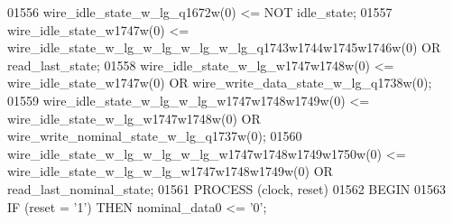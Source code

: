 \begin{DoxyCode}
{01556     \textcolor{vhdlchar}{wire_idle_state_w_lg_q1672w}\textcolor{vhdlchar}{(}\textcolor{vhdllogic}{}\textcolor{vhdllogic}{0}\textcolor{vhdlchar}{)} \textcolor{vhdlchar}{<=} \textcolor{keywordflow}{NOT} \textcolor{vhdlchar}{idle_state};
01557     \textcolor{vhdlchar}{wire_idle_state_w1747w}\textcolor{vhdlchar}{(}\textcolor{vhdllogic}{}\textcolor{vhdllogic}{0}\textcolor{vhdlchar}{)} \textcolor{vhdlchar}{<=} \textcolor{vhdlchar}{
      wire_idle_state_w_lg_w_lg_w_lg_w_lg_q1743w1744w1745w1746w}\textcolor{vhdlchar}{(}\textcolor{vhdllogic}{}\textcolor{vhdllogic}{0}\textcolor{vhdlchar}{)} \textcolor{keywordflow}{OR} \textcolor{vhdlchar}{read_last_state};
01558     \textcolor{vhdlchar}{wire_idle_state_w_lg_w1747w1748w}\textcolor{vhdlchar}{(}\textcolor{vhdllogic}{}\textcolor{vhdllogic}{0}\textcolor{vhdlchar}{)} \textcolor{vhdlchar}{<=} \textcolor{vhdlchar}{wire_idle_state_w1747w}\textcolor{vhdlchar}{(}\textcolor{vhdllogic}{}\textcolor{vhdllogic}{0}\textcolor{vhdlchar}{)} \textcolor{keywordflow}{OR} \textcolor{vhdlchar}{
      wire_write_data_state_w_lg_q1738w}\textcolor{vhdlchar}{(}\textcolor{vhdllogic}{}\textcolor{vhdllogic}{0}\textcolor{vhdlchar}{)};
01559     \textcolor{vhdlchar}{wire_idle_state_w_lg_w_lg_w1747w1748w1749w}\textcolor{vhdlchar}{(}\textcolor{vhdllogic}{}\textcolor{vhdllogic}{0}\textcolor{vhdlchar}{)} \textcolor{vhdlchar}{<=} \textcolor{vhdlchar}{
      wire_idle_state_w_lg_w1747w1748w}\textcolor{vhdlchar}{(}\textcolor{vhdllogic}{}\textcolor{vhdllogic}{0}\textcolor{vhdlchar}{)} \textcolor{keywordflow}{OR} \textcolor{vhdlchar}{wire_write_nominal_state_w_lg_q1737w}\textcolor{vhdlchar}{(}\textcolor{vhdllogic}{}\textcolor{vhdllogic}{0}\textcolor{vhdlchar}{)};
01560     \textcolor{vhdlchar}{wire_idle_state_w_lg_w_lg_w_lg_w1747w1748w1749w1750w}\textcolor{vhdlchar}{(}\textcolor{vhdllogic}{}\textcolor{vhdllogic}{0}\textcolor{vhdlchar}{)} \textcolor{vhdlchar}{<=} \textcolor{vhdlchar}{
      wire_idle_state_w_lg_w_lg_w1747w1748w1749w}\textcolor{vhdlchar}{(}\textcolor{vhdllogic}{}\textcolor{vhdllogic}{0}\textcolor{vhdlchar}{)} \textcolor{keywordflow}{OR} \textcolor{vhdlchar}{read_last_nominal_state};
01561     \textcolor{keywordflow}{PROCESS} (clock, reset)
01562 \textcolor{vhdlkeyword}{    BEGIN}
01563         \textcolor{keywordflow}{IF} \textcolor{vhdlchar}{(}\textcolor{vhdlchar}{reset} \textcolor{vhdlchar}{=} \textcolor{vhdlchar}{'}\textcolor{vhdllogic}{}\textcolor{vhdllogic}{1}\textcolor{vhdlchar}{'}\textcolor{vhdlchar}{)} \textcolor{keywordflow}{THEN} \textcolor{vhdlchar}{nominal_data0} \textcolor{vhdlchar}{<=} \textcolor{vhdlchar}{'}\textcolor{vhdllogic}{}\textcolor{vhdllogic}{0}\textcolor{vhdlchar}{'};
}
\end{DoxyCode}
